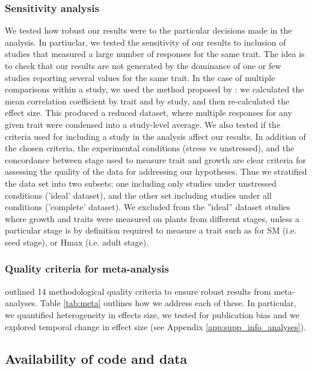 \documentclass[a4paper,11pt]{article}
\begin{document}
\subsubsection*{Sensitivity analysis}\label{sensitivity-analysis}

We tested how robust our results were to the particular decisions made in the analysis.
In partiuclar, we tested the sensitivity of our results to inclusion of studies that measured a large number of responses for the same trait. The idea is to check that our results are not generated by the dominance of one or few studies reporting several values for the same trait. In the case of multiple comparisons within a study, we used the method proposed by \citet{Borenstein:2009um}: we calculated the mean correlation coefficient by trait and by study, and then re-calculated the effect size. This produced a reduced dataset, where multiple responses for any given trait were condensed into a study-level average.
We also tested if the criteria used for including a study in the analysis affect our results. In addition of the chosen criteria, the experimental conditions (stress vs unstressed), and the concordance between stage used to measure trait and growth are clear criteria for assessing the quality of the data for addressing our hypotheses. Thus we stratified the data set into two subsets: one including only studies under unstressed conditions ('ideal' dataset), and the other set including studies under all conditions ('complete' dataset). We excluded from the ''ideal'' dataset studies where growth and traits were measured on plants from different stages, unless a particular stage is by definition required to measure a trait such as for SM (i.e. seed stage), or Hmax (i.e. adult stage).


\subsubsection*{Quality criteria for meta-analysis}

\cite{Koricheva:2014ku} outlined 14 methodological quality criteria to ensure robust results from meta-analyses. Table \ref{tab:meta} outlines how we address each of these.  In particular, we quantified heterogeneity in effects size, we tested for publication bias and we explored temporal change in effect size (see Appendix \ref{app:supp_info_analyses}).

\subsection*{Availability of code and data}\label{code}
\end{document}
